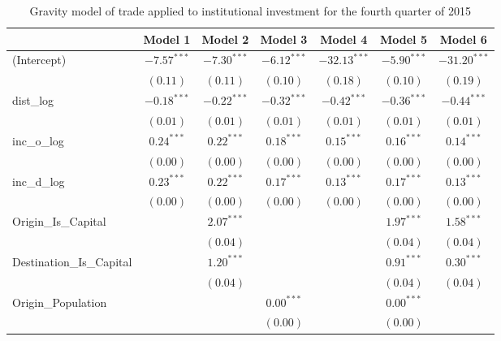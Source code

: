 \begin{table}
	\begin{center}
		\small
		\caption[CGravity Model of Trade for Q4 2015]{Gravity model of trade applied to institutional investment for the fourth quarter of 2015}
		\begin{tabular}{l c c c c c c }
			\hline
			& Model 1 & Model 2 & Model 3 & Model 4 & Model 5 & Model 6 \\
			\hline
			(Intercept)                  & $-7.57^{***}$ & $-7.30^{***}$ & $-6.12^{***}$ & $-32.13^{***}$ & $-5.90^{***}$ & $-31.20^{***}$ \\
			& $(0.11)$      & $(0.11)$      & $(0.10)$      & $(0.18)$       & $(0.10)$      & $(0.19)$       \\
			dist\_log                    & $-0.18^{***}$ & $-0.22^{***}$ & $-0.32^{***}$ & $-0.42^{***}$  & $-0.36^{***}$ & $-0.44^{***}$  \\
			& $(0.01)$      & $(0.01)$      & $(0.01)$      & $(0.01)$       & $(0.01)$      & $(0.01)$       \\
			inc\_o\_log                  & $0.24^{***}$  & $0.22^{***}$  & $0.18^{***}$  & $0.15^{***}$   & $0.16^{***}$  & $0.14^{***}$   \\
			& $(0.00)$      & $(0.00)$      & $(0.00)$      & $(0.00)$       & $(0.00)$      & $(0.00)$       \\
			inc\_d\_log                  & $0.23^{***}$  & $0.22^{***}$  & $0.17^{***}$  & $0.13^{***}$   & $0.17^{***}$  & $0.13^{***}$   \\
			& $(0.00)$      & $(0.00)$      & $(0.00)$      & $(0.00)$       & $(0.00)$      & $(0.00)$       \\
			Origin\_Is\_Capital          &               & $2.07^{***}$  &               &                & $1.97^{***}$  & $1.58^{***}$   \\
			&               & $(0.04)$      &               &                & $(0.04)$      & $(0.04)$       \\
			Destination\_Is\_Capital     &               & $1.20^{***}$  &               &                & $0.91^{***}$  & $0.30^{***}$   \\
			&               & $(0.04)$      &               &                & $(0.04)$      & $(0.04)$       \\
			Origin\_Population           &               &               & $0.00^{***}$  &                & $0.00^{***}$  &                \\
			&               &               & $(0.00)$      &                & $(0.00)$      &                \\

\end{tabular}
\end{center}
\end{table}
